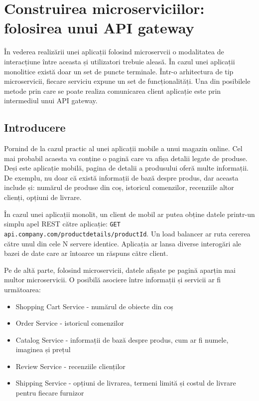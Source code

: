 \documentclass[12pt, a4paper, oneside, romanian]{teza-upb}
\begin{document}
\newpage
\section{Construirea microserviciilor: folosirea unui API gateway}

În vederea realizării unei aplicații folosind microservcii o modalitatea de interacțiune între aceasta și utilizatori trebuie aleasă. În cazul unei aplicații monolitice există doar un set de puncte terminale. Într-o arhitectura de tip microservicii, fiecare serviciu expune un set de funcționalități. Una din posibilele metode prin care se poate realiza comunicarea client aplicație este prin intermediul unui API gateway. 

\subsection{Introducere}

Pornind de la cazul practic al unei aplicații mobile a unui magazin online. Cel mai probabil acaesta va conține o pagină care va afișa detalii legate de produse. Deși este aplicație mobilă, pagina de detalii a produsului oferă multe informații. De exemplu, nu doar că există informații de bază despre produs, dar aceasta include și: numărul de produse din coș, istoricul comenzilor, recenziile altor clienți, opțiuni de livrare.

În cazul unei aplicații monolit, un client de mobil ar putea obține datele printr-un simplu apel REST către aplicație: \texttt{GET api.company.com/productdetails/productId}. Un load balancer ar ruta cererea către unul din cele N servere identice. Aplicația ar lansa diverse interogări ale bazei de date care ar întoarce un răspuns către client. 

Pe de altă parte, folosind microservicii, datele afișate pe pagină aparțin mai multor microservicii. O posibilă asociere între informații și servicii ar fi următoarea:
\begin{itemize}
	\item Shopping Cart Service - numărul de obiecte din coș
	\item Order Service - istoricul comenzilor
	\item Catalog Service - informații de bază despre produs, cum ar fi numele, imaginea și prețul
	\item Review Service - recenziile clienților
	\item Shipping Service - opțiuni de livrarea, termeni limită și costul de livrare pentru fiecare furnizor
\end{itemize}
\end{document}
